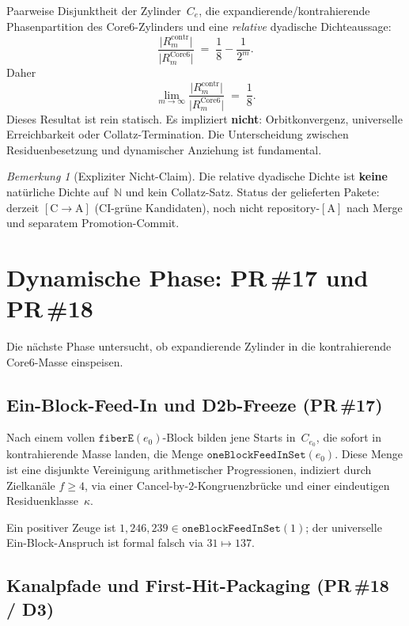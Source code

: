 \documentclass[11pt,a4paper]{article}
\theoremstyle{definition}
\theoremstyle{remark}
\newtheorem{remark}[theorem]{Bemerkung}
\newcommand{\CA}{\ensuremath{[\mathrm{C}\!\to\!\mathrm{A}]}}
\newcommand{\tagA}{\ensuremath{[\mathrm{A}]}}
\newcommand{\N}{\mathbb{N}}
\begin{document}
Paarweise Disjunktheit der Zylinder~$C_e$, die expandierende/kontrahierende
Phasenpartition des Core6-Zylinders und eine \emph{relative} dyadische
Dichteaussage:
\[
  \frac{\lvert R_m^{\mathrm{contr}}\rvert}
       {\lvert R_m^{\mathrm{Core6}}\rvert}
  \;=\;
  \frac18 - \frac1{2^m}.
\]
Daher
\[
  \lim_{m\to\infty}
  \frac{\lvert R_m^{\mathrm{contr}}\rvert}
       {\lvert R_m^{\mathrm{Core6}}\rvert}
  \;=\;
  \frac18.
\]
Dieses Resultat ist rein statisch. Es impliziert \textbf{nicht}:
Orbitkonvergenz, universelle Erreichbarkeit oder Collatz-Termination.
Die Unterscheidung zwischen Residuenbesetzung und dynamischer Anziehung ist
fundamental.

\begin{remark}[Expliziter Nicht-Claim]
Die relative dyadische Dichte ist \textbf{keine} natürliche Dichte auf~$\N$
und kein Collatz-Satz. Status der gelieferten Pakete: derzeit \CA{}
(CI-grüne Kandidaten), noch nicht repository-\tagA{} nach Merge und
separatem Promotion-Commit.
\end{remark}

\section{Dynamische Phase: PR\,\#17 und PR\,\#18}

Die nächste Phase untersucht, ob expandierende Zylinder in die
kontrahierende Core6-Masse einspeisen.

\subsection{Ein-Block-Feed-In und D2b-Freeze (PR\,\#17)}

Nach einem vollen $\mathtt{fiberE}(e_0)$-Block bilden jene Starts in~$C_{e_0}$,
die sofort in kontrahierende Masse landen, die Menge
$\mathtt{oneBlockFeedInSet}(e_0)$. Diese Menge ist eine disjunkte Vereinigung
arithmetischer Progressionen, indiziert durch Zielkanäle $f\ge 4$, via einer
Cancel-by-$2$-Kongruenzbrücke und einer eindeutigen Residuenklasse~$\kappa$.

Ein positiver Zeuge ist $1{,}246{,}239\in\mathtt{oneBlockFeedInSet}(1)$;
der universelle Ein-Block-Anspruch ist formal falsch via $31\mapsto 137$.

\subsection{Kanalpfade und First-Hit-Packaging (PR\,\#18 / D3)}
\end{document}
